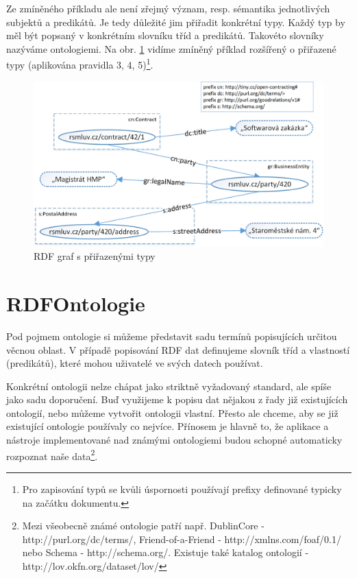 Ze zmíněného příkladu ale není zřejmý význam, resp. sémantika jednotlivých subjektů a predikátů. Je tedy důležité jim přiřadit konkrétní typy. Každý typ by měl být popsaný v konkrétním slovníku tříd a predikátů. Takovéto slovníky nazýváme ontologiemi. Na obr. \ref{obr:rdf_graphWithOntology} vidíme zmíněný příklad rozšířený o přiřazené typy (aplikována pravidla 3, 4, 5)\footnote{Pro zapisování typů se kvůli úspornosti používají prefixy definované typicky na začátku dokumentu.}.

\begin{figure}[h]
\centerline{\includegraphics[width=\textwidth]{img/rdf_graphWithOntology.eps}}
\caption{RDF graf s přiřazenými typy}
\label{obr:rdf_graphWithOntology}
\end{figure}

\section{RDFOntologie}

Pod pojmem ontologie si můžeme představit sadu termínů popisujících určitou věcnou oblast. V případě popisování RDF dat definujeme slovník tříd a vlastností (predikátů), které mohou uživatelé ve svých datech používat.

Konkrétní ontologii nelze chápat jako striktně vyžadovaný standard, ale spíše jako sadu doporučení. Buď využijeme k popisu dat nějakou z řady již existujících ontologií, nebo můžeme vytvořit ontologii vlastní. Přesto ale chceme, aby se již existující ontologie používaly co nejvíce. Přínosem je hlavně to, že aplikace a nástroje implementované nad známými ontologiemi budou schopné automaticky rozpoznat naše data\footnote{Mezi všeobecně známé ontologie patří např. DublinCore - http://purl.org/dc/terms/, Friend-of-a-Friend - http://xmlns.com/foaf/0.1/ nebo Schema - http://schema.org/. Existuje také katalog ontologií - http://lov.okfn.org/dataset/lov/}. 

